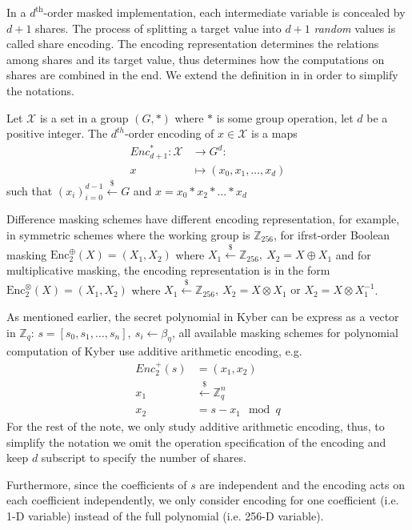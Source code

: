 \documentclass{llncs}
\begin{document}
In a $d^{\text{th}}$-order masked implementation, each intermediate variable is concealed by $d + 1$ shares. The process of splitting a target value into $d+1$ \textit{random} values is called share encoding. The encoding representation determines the relations among shares and its target value, thus determines how the computations on shares are combined in the end. We extend the definition in \cite{Prouff13} in order to simplify the notations.
\begin{definition}
	Let $\mathcal{X}$ is a set in a group $(G, \ast)$ where $\ast$ is some group operation, let $d$ be a positive integer. The $d^{th}$-order encoding of $x \in \mathcal{X}$ is a maps
	\begin{align*} 
		{Enc}^{\ast}_{d+1}: \mathcal{X} &\rightarrow G^d:\\ 
		x &\mapsto (x_0, x_1, \dots, x_d)
	\end{align*}
such that $(x_i)_{i=0}^{d-1} \overset{\$}{\leftarrow} G$ and $x = x_0 \ast x_2 \ast \dots \ast x_d$	
\end{definition}
Difference masking schemes have different encoding representation, for example, in symmetric schemes where the working group is $\mathbb{Z}_{256}$, for ifrst-order Boolean masking $\text{Enc}^{\oplus}_{2}(X) = (X_1, X_2)$ where $X_1 \overset{\$}{\leftarrow} \mathbb{Z}_{256},\ X_2 = X \oplus X_1$ and for multiplicative masking, the encoding representation is in the form $\text{Enc}^{\otimes}_{2}(X) = (X_1, X_2)$ where $X_1 \overset{\$}{\leftarrow} \mathbb{Z}_{256},\ X_2 = X \otimes X_1 \text{ or } X_2 = X \otimes X_1^{-1}$.

As mentioned earlier, the secret polynomial in Kyber can be express as a vector in $\mathbb{Z}_q$:
$s = [s_0, s_1, \dots, s_n],\ s_i \leftarrow \beta_{\eta}$, all available masking schemes for polynomial computation of Kyber  use additive arithmetic encoding, e.g.
\begin{align*}
	Enc_2^{+}(s) &= (x_1, x_2)\\
	x_1 &\overset{\$}{\leftarrow} \mathbb{Z}_q^n\\
	x_2 &= s-x_1 \mod q
\end{align*}
For the rest of the note, we only study additive arithmetic encoding, thus, to simplify the notation we omit the operation specification of the encoding and keep $d$ subscript to specify the number of shares. 

Furthermore, since the coefficients of $s$ are independent and the encoding acts on each coefficient independently, we only consider encoding for one coefficient (i.e. 1-D variable) instead of the full polynomial (i.e. 256-D variable).
\end{document}
